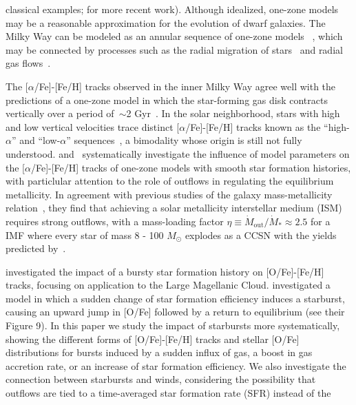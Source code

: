 classical examples; \citealp{Weinberg2017b, Andrews2017} for 
more recent work). Although idealized, one-zone models may be a reasonable 
approximation for the evolution of dwarf galaxies. The Milky Way can be 
modeled as an annular sequence of one-zone models ~\citep{Matteucci1989}, 
which may be connected by processes such as the radial migration of 
stars~\citep{Schoenrich2009a, Minchev2017} and radial gas 
flows~\citep{Lacey1985, Bilitewski2012}. 
\par 
The [$\alpha$/Fe]-[Fe/H] tracks observed in the inner Milky Way agree well with 
the predictions of a one-zone model in which the star-forming gas disk 
contracts vertically over a period of~$\sim$2 Gyr~\citep{Hayden2015, 
Freudenburg2017}. In the solar neighborhood, stars with high and low vertical 
velocities trace distinct [$\alpha$/Fe]-[Fe/H] tracks known as the 
``high-$\alpha$'' and ``low-$\alpha$'' sequences~\citep{Bensby2003, 
Hayden2015}, a bimodality whose origin is still not fully understood. 
\citet{Andrews2017} and~\citet{Weinberg2017b} systematically 
investigate the influence of model parameters on the [$\alpha$/Fe]-[Fe/H] 
tracks of one-zone models with smooth star formation histories, with 
particlular attention to the role of outflows in regulating the equilibrium 
metallicity. In agreement with previous studies of the galaxy mass-metallicity 
relation~\citep[e.g. ][]{Dalcanton2007, Finlator2008, Peeples2011, Zahid2012}, 
they find that achieving a solar metallicity interstellar medium (ISM) requires 
strong outflows, with a mass-loading factor $\eta\equiv\dot{M}_\text{out}/
\dot{M}_*\approx2.5$ for a~\citet{Kroupa2001} IMF where every star of mass 
8 - 100 $M_\odot$ explodes as a CCSN with the yields predicted 
by~\citet{Chieffi2004,Chieffi2013}. 
\par 
\citet{Gilmore1991} investigated the impact of a bursty star formation history 
on [O/Fe]-[Fe/H] tracks, focusing on application to the Large Magellanic 
Cloud. \citet{Weinberg2017b} investigated a model in which a sudden change 
of star formation efficiency induces a starburst, causing an upward jump in 
[O/Fe] followed by a return to equilibrium (see their Figure 9). In this 
paper we study the impact of starbursts more systematically, showing the 
different forms of [O/Fe]-[Fe/H] tracks and stellar [O/Fe] distributions for 
bursts induced by a sudden influx of gas, a boost in gas accretion rate, or 
an increase of star formation efficiency. We also investigate the 
connection between starbursts and winds, considering the possibility that 
outflows are tied to a time-averaged star formation rate (SFR) instead of the 
